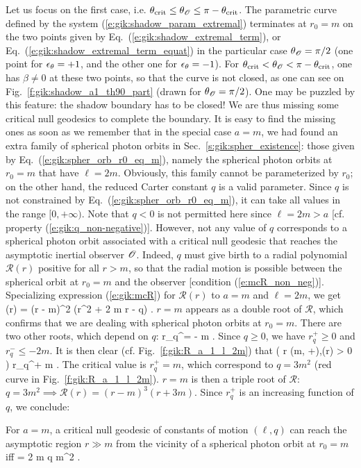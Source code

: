 Let us focus on the first case, i.e. $\theta_{\rm crit} \leq \theta_{\mathscr{O}} \leq \pi - \theta_{\rm crit}$.
The parametric curve defined by
the system (\ref{e:gik:shadow_param_extremal}) terminates at $r_0 = m$ on the two points
given by Eq.~(\ref{e:gik:shadow_extremal_term}), or Eq.~(\ref{e:gik:shadow_extremal_term_equat})
in the particular case $\theta_{\mathscr{O}} = \pi/2$ (one point for $\epsilon_\theta=+1$, and the other one
for $\epsilon_\theta=-1$). For $\theta_{\rm crit} < \theta_{\mathscr{O}} < \pi - \theta_{\rm crit}$, one has
$\beta \neq 0$ at these two points, so that the curve is not closed, as one can see
on Fig.~\ref{f:gik:shadow_a1_th90_part} (drawn for $\theta_{\mathscr{O}} = \pi/2$).
One may be puzzled by this feature: the shadow boundary has to be closed!
We are thus missing some critical null geodesics to complete the boundary.
It is easy to find the missing ones as soon as we remember that in the
special case $a=m$, we had found an extra family of spherical photon orbits
in Sec.~\ref{s:gik:spher_existence}: those given by Eq.~(\ref{e:gik:spher_orb_r0_eq_m}),
namely the spherical photon orbits at $r_0 = m$ that have
$\ell = 2m$. Obviously, this family cannot be parameterized by $r_0$; on the other hand,
the reduced Carter constant $q$ is a valid parameter. Since $q$ is
not constrained by Eq.~(\ref{e:gik:spher_orb_r0_eq_m}), it can take all
values in the range $[0, +\infty)$. Note that $q<0$ is not permitted here
since $\ell = 2 m > a$ [cf. property (\ref{e:gik:q_non-negative})].
However, not any value of $q$ corresponds to a spherical photon orbit associated
with a critical null geodesic that reaches the asymptotic inertial observer $\mathscr{O}$.
Indeed, $q$ must give birth to a radial polynomial
$\mathcal{R}(r)$ positive for all $r > m$, so that the radial
motion is possible between the spherical orbit at $r_0=m$
 and the observer [condition (\ref{e:mcR_non_neg})].
Specializing expression (\ref{e:gik:mcR}) for $\mathcal{R}(r)$ to $a=m$ and $\ell=2m$,
we get
\be
    (r) = (r - m)^2 (r^2 + 2 m r - q) .
\ee
$r = m$ appears as a double root of $\mathcal{R}$, which confirms that we are dealing
with spherical photon orbits at $r_0 = m$. There are two other roots, which depend
on $q$:
\be \label{e:gik:root_rq}
    r_q^\pm = \pm {} - m .
\ee
Since $q\geq 0$, we have $r_q^+ \geq 0$ and $r_q^- \leq - 2m$.
It is then clear (cf. Fig.~\ref{f:gik:R_a_1_l_2m}) that
\be
     \left( \forall r \in (m, +\infty),\quad  {}(r) > 0 \right) \iff r_q^+ \leq m .
\ee
The critical value is $r_q^+ = m$, which correspond to $q = 3 m^2$ (red curve
in Fig.~\ref{f:gik:R_a_1_l_2m}). $r=m$ is then a triple root of $\mathcal{R}$:
$q = 3 m^2 \implies \mathcal{R}(r) = ( r - m)^3 (r + 3m)$. Since $r_q^+$
is an increasing function of $q$, we conclude:
\begin{prop}
For $a=m$, a critical null geodesic
of constants of motion $(\ell, q)$ can reach the asymptotic region $r\gg m$
from the vicinity of a spherical photon orbit at $r_0 = m$ iff
\be \label{e:gik:critical_from_NHEK}
    \ell = 2 m  \leq q  m^2 .
\ee
\end{prop}


